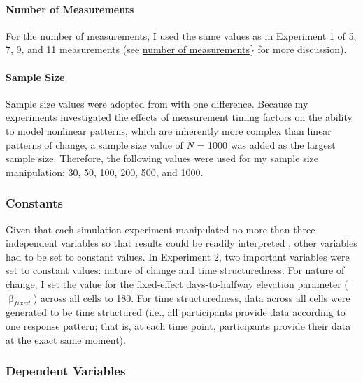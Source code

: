 \documentclass[
12pt, %
twoside,
english]{guelphthesis}
\begin{document}
\hypertarget{number-of-measurements-1}{%
\paragraph{Number of Measurements}\label{number-of-measurements-1}}

For the number of measurements, I used the same values as in Experiment 1 of 5, 7, 9, and 11 measurements (see \protect\hyperlink{number-measurements}{number of measurements}\} for more discussion).

\hypertarget{sample-size}{%
\paragraph{Sample Size}\label{sample-size}}

Sample size values were adopted from \textcite{coulombe2016} with one difference.
Because my experiments investigated the effects of measurement timing
factors on the ability to model nonlinear patterns, which are inherently
more complex than linear patterns of change, a sample size value of \emph{N}
= 1000 was added as the largest sample size. Therefore, the following
values were used for my sample size manipulation: 30, 50, 100, 200, 500,
and 1000.

\hypertarget{constants-exp2}{%
\subsubsection{Constants}\label{constants-exp2}}

Given that each simulation experiment manipulated no more than three independent variables so that results could be readily interpreted \autocite{halford2005}, other variables had to be set to constant values. In Experiment 2, two important variables were set to constant values: nature of change and time structuredness. For nature of change, I set the value for the fixed-effect days-to-halfway elevation parameter (\(\upbeta_{fixed}\)) across all cells to 180. For time structuredness, data across all cells were generated to be time structured (i.e., all participants provide data according to one response pattern; that is, at each time point, participants provide their data at the exact same moment).

\hypertarget{dependent-variables-1}{%
\subsubsection{Dependent Variables}\label{dependent-variables-1}}
\end{document}
